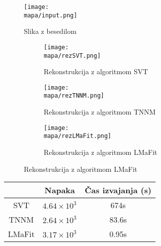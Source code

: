 \renewcommand{\mapa}{Poglavja/Slike/besedilo}

\begin{figure}[!ht]
    \centering
    \texttt{[image: \\mapa/input.png]}
    \caption{Slika z besedilom}
\end{figure}

\begin{figure}[!ht]
    \begin{subfigure}{0.325\linewidth}
        \texttt{[image: \\mapa/rezSVT.png]}
        \caption{Rekonstrukcija z algoritmom SVT}
    \end{subfigure}
    \hfill
    \begin{subfigure}{0.325\linewidth}
        \texttt{[image: \\mapa/rezTNNM.png]}
        \caption{Rekonstrukcija z algoritmom TNNM}
    \end{subfigure}
    \hfill
    \begin{subfigure}{0.325\linewidth}
        \texttt{[image: \\mapa/rezLMaFit.png]}
        \caption{Rekonstrukcija z algoritmom LMaFit}
    \end{subfigure}
\end{figure}

\begin{table}[!ht]
    \centering
    \begin{tabular}{|c|c|c|}
    \hline
    & Napaka & Čas izvajanja (s) \\
    \hline
    SVT & $4.64 \times 10^{3}$ & 674s \\
    TNNM & $2.64 \times 10^{3}$ & 83.6s \\
    LMaFit & $3.17 \times 10^{3}$ & 0.95s \\
    \hline
    \end{tabular}
\end{table}